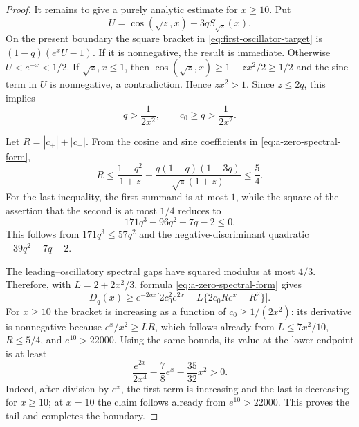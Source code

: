 \documentclass[11pt]{article}
\theoremstyle{remark}
\begin{document}
\begin{proof}
It remains to give a purely analytic estimate for $x\geq10$.  Put
\[
 U=\cos(\sqrt z,x)+3qS_{\sqrt z}(x).
\]
On the present boundary the square bracket in
\eqref{eq:first-oscillator-target} is $(1-q)(e^xU-1)$.  If it is
nonnegative, the result is immediate.  Otherwise $U<e^{-x}<1/2$.  If
$\sqrt z,x\leq1$, then
$\cos(\sqrt z,x)\geq1-zx^2/2\geq1/2$ and the sine term in $U$ is
nonnegative, a contradiction.  Hence $zx^2>1$.  Since $z\leq2q$, this
implies
\begin{equation}\label{eq:a-zero-q-lower}
 q>\frac1{2x^2},\qquad c_0\geq q>\frac1{2x^2}.
\end{equation}

Let $R=|c_+|+|c_-|$.  From the cosine and sine coefficients in
\eqref{eq:a-zero-spectral-form},
\[
 R\leq\frac{1-q^2}{1+z}
 +\frac{q(1-q)(1-3q)}{\sqrt z(1+z)}\leq\frac54.
\]
For the last inequality, the first summand is at most $1$, while the square
of the assertion that the second is at most $1/4$ reduces to
\[
 171q^3-96q^2+7q-2\leq0.
\]
This follows from $171q^3\leq57q^2$ and the negative-discriminant quadratic
$-39q^2+7q-2$.

The leading--oscillatory spectral gaps have squared modulus at most $4/3$.
Therefore, with $L=2+2x^2/3$, formula
\eqref{eq:a-zero-spectral-form} gives
\[
 D_q(x)\geq e^{-2qx}\bigl[
 2c_0^2e^{2x}-L\{2c_0Re^x+R^2\}\bigr].
\]
For $x\geq10$ the bracket is increasing as a function of
$c_0\geq1/(2x^2)$: its derivative is nonnegative because
$e^x/x^2\geq LR$, which follows already from
$L\leq7x^2/10$, $R\leq5/4$, and $e^{10}>22000$.
Using the same bounds, its value at the lower endpoint is at least
\[
 \frac{e^{2x}}{2x^4}-\frac78e^x-\frac{35}{32}x^2>0.
\]
Indeed, after division by $e^x$, the first term is increasing and the last
is decreasing for $x\geq10$; at $x=10$ the claim follows already from
$e^{10}>22000$.  This proves the tail and completes the boundary.
\end{proof}
\end{document}
